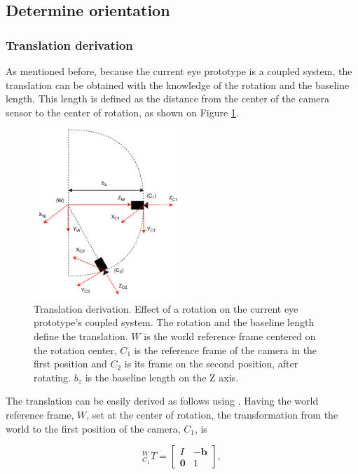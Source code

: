 \subsection{Determine orientation}

\subsubsection{Translation derivation}

As mentioned before, because the current eye prototype is a coupled system, the translation can be obtained with the knowledge of the rotation and the baseline length. This length is defined as the distance from the center of the camera sensor to the center of rotation, as shown on Figure
\ref{cha3:detori:translation}.

\begin{figure}[ht]
	\centering
	\includegraphics[width=0.5\textwidth]{images/transf.pdf}
	\caption[Translation derivation]{Translation derivation. Effect of a rotation on the current eye prototype's coupled system. The rotation and the baseline length define the translation. ${W}$ is the world reference frame centered on the rotation center, ${C_1}$ is the reference frame of the camera in the first position and ${C_2}$ is its frame on the second position, after rotating. $b_z$ is the baseline length on the Z axis.}
	\label{cha3:detori:translation}
\end{figure}

The translation can be easily derived as follows using . Having the world reference frame, ${W}$, set at the center of rotation, the transformation from the world to the first position of the camera, ${C_1}$, is

\begin{equation}
^W_{C_1}T = \begin{bmatrix}
I & -\mathbf{b}\\ 
\mathbf{0} & 1
\end{bmatrix},
\end{equation} 

